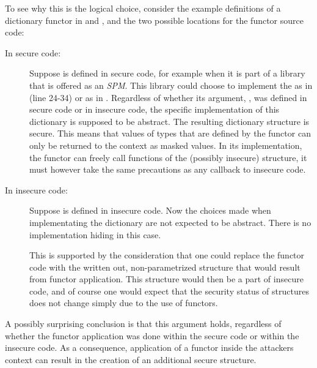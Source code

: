 To see why this is the logical choice, consider the example definitions of a dictionary functor in  and , and the two possible locations for the functor source code:
\begin{description}
\item[In secure code:] 
Suppose  is defined in secure code, for example when it is part of a library that is offered as an \emph{SPM}.
This library could choose to implement the  as in  (line 24-34) or as in .
Regardless of whether its argument, , was defined in secure code or in insecure code, the specific implementation of this dictionary is supposed to be abstract.
The resulting dictionary structure is secure.
This means that values of types that are defined by the functor can only be returned to the context as masked values.
In its implementation, the functor can freely call functions of the (possibly insecure) structure, it must however take the same precautions as any callback to insecure code.
\item[In insecure code:] Suppose  is defined in insecure code.
Now the choices made when implementating the dictionary are not expected to be abstract. There is no implementation hiding in this case.

This is supported by the consideration that one could replace the functor code with the written out, non-parametrized structure that would result from functor application.
This structure would then be a part of insecure code, and of course one would expect that the security status of structures does not change simply due to the use of functors.
\end{description}

A possibly surprising conclusion is that this argument holds, regardless of whether the functor application was done within the secure code or within the insecure code.
As a consequence, application of a functor inside the attackers context can result in the creation of an additional secure structure.

